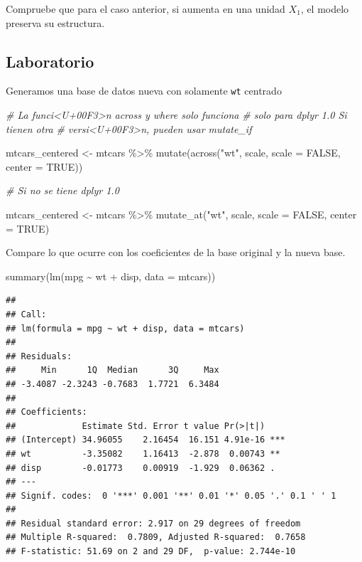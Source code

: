 \documentclass[
  12pt,
]{book}
\newenvironment{Shaded}{\begin{snugshade}}{\end{snugshade}}
\newcommand{\AttributeTok}[1]{\textcolor[rgb]{0.77,0.63,0.00}{#1}}
\newcommand{\CommentTok}[1]{\textcolor[rgb]{0.56,0.35,0.01}{\textit{#1}}}
\newcommand{\ConstantTok}[1]{\textcolor[rgb]{0.00,0.00,0.00}{#1}}
\newcommand{\FunctionTok}[1]{\textcolor[rgb]{0.00,0.00,0.00}{#1}}
\newcommand{\NormalTok}[1]{#1}
\newcommand{\OtherTok}[1]{\textcolor[rgb]{0.56,0.35,0.01}{#1}}
\newcommand{\SpecialCharTok}[1]{\textcolor[rgb]{0.00,0.00,0.00}{#1}}
\newcommand{\StringTok}[1]{\textcolor[rgb]{0.31,0.60,0.02}{#1}}
\begin{document}
\leavevmode{}%
Compruebe que para el caso anterior, si aumenta en una unidad \(X_{1}\),
el modelo preserva su estructura.

\hypertarget{laboratorio-5}{%
\subsection{Laboratorio}\label{laboratorio-5}}

Generamos una base de datos nueva con solamente \texttt{wt} centrado

\begin{Shaded}
\begin{Highlighting}[]
\CommentTok{\# La funci\textless{}U+00F3\textgreater{}n across y where solo funciona}
\CommentTok{\# solo para dplyr 1.0 Si tienen otra}
\CommentTok{\# versi\textless{}U+00F3\textgreater{}n, pueden usar mutate\_if}

\NormalTok{mtcars\_centered }\OtherTok{\textless{}{-}}\NormalTok{ mtcars }\SpecialCharTok{\%\textgreater{}\%}
    \FunctionTok{mutate}\NormalTok{(}\FunctionTok{across}\NormalTok{(}\StringTok{"wt"}\NormalTok{, scale, }\AttributeTok{scale =} \ConstantTok{FALSE}\NormalTok{, }\AttributeTok{center =} \ConstantTok{TRUE}\NormalTok{))}

\CommentTok{\# Si no se tiene dplyr 1.0}

\NormalTok{mtcars\_centered }\OtherTok{\textless{}{-}}\NormalTok{ mtcars }\SpecialCharTok{\%\textgreater{}\%}
    \FunctionTok{mutate\_at}\NormalTok{(}\StringTok{"wt"}\NormalTok{, scale, }\AttributeTok{scale =} \ConstantTok{FALSE}\NormalTok{, }\AttributeTok{center =} \ConstantTok{TRUE}\NormalTok{)}
\end{Highlighting}
\end{Shaded}

Compare lo que ocurre con los coeficientes de la base original y la
nueva base.

\begin{Shaded}
\begin{Highlighting}[]
\FunctionTok{summary}\NormalTok{(}\FunctionTok{lm}\NormalTok{(mpg }\SpecialCharTok{\textasciitilde{}}\NormalTok{ wt }\SpecialCharTok{+}\NormalTok{ disp, }\AttributeTok{data =}\NormalTok{ mtcars))}
\end{Highlighting}
\end{Shaded}

\begin{verbatim}
## 
## Call:
## lm(formula = mpg ~ wt + disp, data = mtcars)
## 
## Residuals:
##     Min      1Q  Median      3Q     Max 
## -3.4087 -2.3243 -0.7683  1.7721  6.3484 
## 
## Coefficients:
##             Estimate Std. Error t value Pr(>|t|)    
## (Intercept) 34.96055    2.16454  16.151 4.91e-16 ***
## wt          -3.35082    1.16413  -2.878  0.00743 ** 
## disp        -0.01773    0.00919  -1.929  0.06362 .  
## ---
## Signif. codes:  0 '***' 0.001 '**' 0.01 '*' 0.05 '.' 0.1 ' ' 1
## 
## Residual standard error: 2.917 on 29 degrees of freedom
## Multiple R-squared:  0.7809, Adjusted R-squared:  0.7658 
## F-statistic: 51.69 on 2 and 29 DF,  p-value: 2.744e-10
\end{verbatim}
\end{document}
